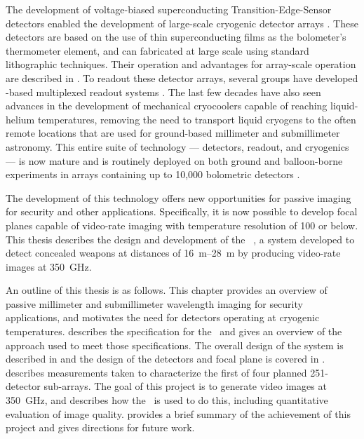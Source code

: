 The development of voltage-biased superconducting Transition-Edge-Sensor detectors enabled the development of large-scale cryogenic detector arrays \cite{irwin_application_1995}.
These detectors are based on the use of thin superconducting films as the bolometer's thermometer element, and can fabricated at large scale using standard lithographic techniques.
Their operation and advantages for array-scale operation are described in .
To readout these detector arrays, several groups have developed \SQUID-based multiplexed readout systems \cite{tdm,berkeley fdm, europe}.
The last few decades have also seen advances in the development of mechanical cryocoolers capable of reaching liquid-helium temperatures, removing the need to transport liquid cryogens to the often remote locations that are used for ground-based millimeter and submillimeter astronomy.
This entire suite of technology --- detectors, readout, and cryogenics --- is now mature and is routinely deployed on both ground and balloon-borne experiments in arrays containing up to 10,000 bolometric detectors \cite{holland_scuba-2:_2013}.

The development of this technology offers new opportunities for passive imaging for security and other applications.
Specifically, it is now possible to develop focal planes capable of video-rate imaging with temperature resolution of \SI{100}{\mK} or below.
This thesis describes the design and development of the \NIST\ \Imager, a system developed to detect concealed weapons at distances of \SIrange{16}{28}{\m} by producing video-rate images at \SI{350}{\GHz}.

An outline of this thesis is as follows.
This chapter provides an overview of passive millimeter and submillimeter wavelength imaging for security applications, and motivates the need for detectors operating at cryogenic temperatures.
 describes the specification for the \Imager\ and gives an overview of the approach used to meet those specifications.
The overall design of the system is described in  and the design of the detectors and focal plane is covered in .
 describes measurements taken to characterize the first of four planned 251-detector sub-arrays.
The goal of this project is to generate video images at \SI{350}{\GHz}, and  describes how the \Imager\ is used to do this, including quantitative evaluation of image quality.
 provides a brief summary of the achievement of this project and gives directions for future work.

